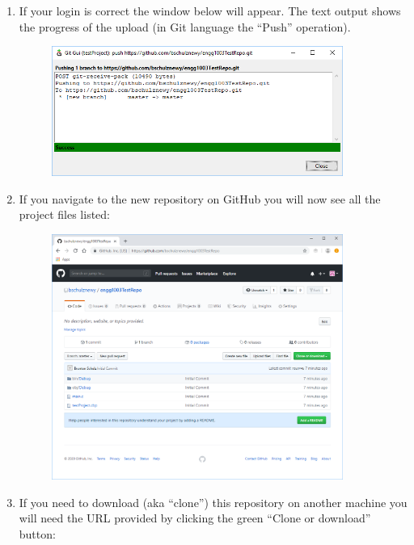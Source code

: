 \documentclass{lab}
\begin{document}
\begin{task}{}{}
\begin{enumerate}
\item If your login is correct the window below will appear. The text output shows the progress of the upload (in Git language the ``Push'' operation).

\begin{figure}[H]
\begin{center}
\includegraphics[width=0.9\textwidth]{Wk1Images/git9}
\end{center}
\end{figure}

\item If you navigate to the new repository on GitHub you will now see all the project files listed:

\begin{figure}[H]
\begin{center}
\includegraphics[width=0.9\textwidth]{Wk1Images/git10}
\end{center}
\end{figure}

\pagebreak
\item If you need to download (aka ``clone'') this repository on another machine you will need the URL provided by clicking the green ``Clone or download'' button:


\end{enumerate}
\end{task}
\end{document}
